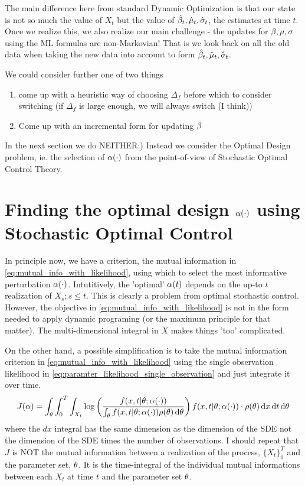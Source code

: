 \documentclass{article}
\begin{document}
The main difference here from standard Dynamic Optimization is
that our state is not so much the value of $X_t$ but the value of $\hat {{\beta}}_t,
\hat {{\mu }}_t, \hat {{\sigma }}_t$, the estimates at time $t$. Once we realize this, we also
realize our main challenge - the updates for ${\beta}, {\mu }, {\sigma }$ using the ML
formulas are non-Markovian! That is we look back on all the old
data when taking the new data into account to form $\hat {{\beta}}_t, \hat {{\mu }}_t, \hat
{{\sigma }}_t$. 

We could consider further one of two things
\begin{enumerate} 
  \item come up with a heuristic way of choosing $\Delta_f$ before which to
  consider switching (if $\Delta_f$ is large enough, we will always switch (I
  think))
  \item Come up with an incremental form for updating ${\beta}$
\end{enumerate}

In the next section we do NEITHER:) Instead we consider the Optimal Design
problem, ie. the selection of ${\alpha}(\cdot)$ from the point-of-view of
Stochastic Optimal Control Theory.



\section{Finding the optimal design ${\alpha}(\cdot)$ using Stochastic
Optimal Control}

In principle now, we have a criterion, the mutual information in
\cref{eq:mutual_info_with_likelihood}, using which to select the most
informative perturbation ${\alpha}(\cdot)$. Intutitively, the 'optimal'  ${\alpha}(t)$
depends on the up-to $t$ realization of $X_s ; s\leq t$. This is clearly a
problem from optimal stochastic control. However, the objective in
\cref{eq:mutual_info_with_likelihood} is not in the form needed to apply dynamic
programing (or the maximum principle for that matter). The multi-dimensional
integral in $X$ makes things 'too' complicated.

On the other hand, a possible simplification is to take the mutual information
criterion in \cref{eq:mutual_info_with_likelihood} using the single observation
likelihood in \cref{eq:paramter_likelihood_single_observation} and just
integrate it over time.
\begin{equation}
J({\alpha})  = \int_{\theta} \int_0^T\int_{X_t}
 \log\left(\frac{f(x,t|{\theta} ; {\alpha}(\cdot) )}
 			{\int_{\theta} f(x,t|{\theta}; {\alpha}(\cdot)) \rho({\theta})\, \mathrm{d} {\theta}}\right) 
 f(x,t|{\theta}; {\alpha}(\cdot)) \cdot \rho({\theta}) \, \mathrm{d} x\, \mathrm{d} t\, \mathrm{d} {\theta}
\label{eq:mutual_info_time_integrated}
\end{equation}
where the $dx$ integral has the same dimension as the dimension of the SDE not
the dimension of the SDE times the number of observations. I should repeat that
$J$ is NOT the mutual information between a realization of the process, $\{
X_t\}_0^T$ and the parameter set, ${\theta}$. It is the time-integral of the
individual mutual informations between each $X_t$ at time $t$ and the parameter
set ${\theta}$. 
\end{document}
